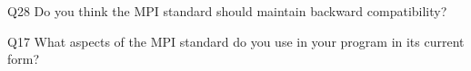 \begin{description}%
\item{Q28} Do you think the MPI standard should maintain backward compatibility?%
\item{Q17} What aspects of the MPI standard do you use in your program in its current form?%
\end{description}%
